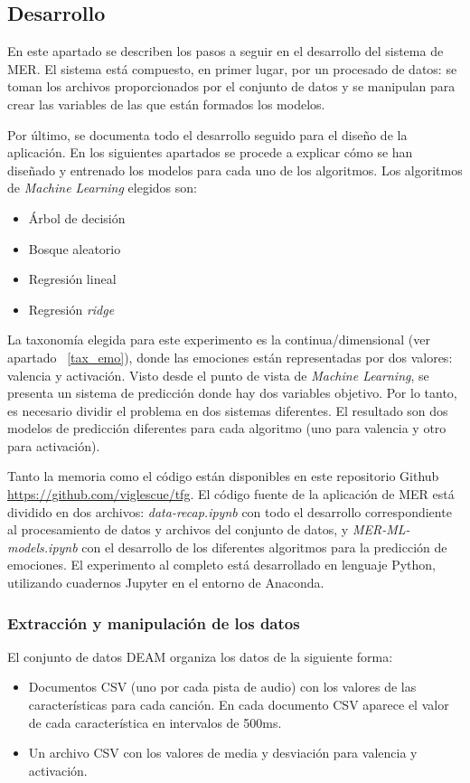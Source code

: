 \documentclass[12pt,a4paper]{article}
\begin{document}
\subsection{Desarrollo}
En este apartado se describen los pasos a seguir en el desarrollo del sistema de MER. El sistema está compuesto, en primer lugar, por un procesado de datos: se toman los archivos proporcionados por el conjunto de datos y se manipulan para crear las variables de las que están formados los modelos.


Por último, se documenta todo el desarrollo seguido para el diseño de la aplicación. En los siguientes apartados se procede a explicar cómo se han diseñado y entrenado los modelos  para cada uno de los algoritmos. Los algoritmos de \textit{Machine Learning} elegidos son:
\begin{itemize}
	\item Árbol de decisión
	\item Bosque aleatorio
	\item Regresión lineal
	\item Regresión \textit{ridge}
\end{itemize}

La taxonomía elegida para este experimento es la continua/dimensional (ver apartado ~\ref{tax_emo}), donde las emociones están representadas por dos valores: valencia y activación. Visto desde el punto de vista de \textit{Machine Learning}, se presenta un sistema de predicción donde hay dos variables objetivo. Por lo tanto, es necesario dividir el problema en dos sistemas diferentes. El resultado son dos modelos de predicción diferentes para cada algoritmo (uno para valencia y otro para activación).


Tanto la memoria como el código están disponibles en este repositorio Github \url{https://github.com/viglescue/tfg}. El código fuente de la aplicación de MER está dividido en dos archivos: \textit{data-recap.ipynb} con todo el desarrollo correspondiente al procesamiento de datos y archivos del conjunto de datos, y \textit{MER-ML-models.ipynb} con el desarrollo de los diferentes algoritmos para la predicción de emociones. El experimento al completo está desarrollado en lenguaje Python, utilizando cuadernos Jupyter en el entorno de Anaconda. 







\subsubsection{Extracción y manipulación de los datos}
El conjunto de datos DEAM \cite{AlajankiEmoInMusicAnalysis} organiza los datos de la siguiente forma:
\begin{itemize}
	\item Documentos CSV (uno por cada pista de audio) con los valores de las características para cada canción. En cada documento CSV aparece el valor de cada característica en intervalos de 500ms.
	\item Un archivo CSV con los valores de media y desviación para valencia y activación.
\end{itemize}
\end{document}
